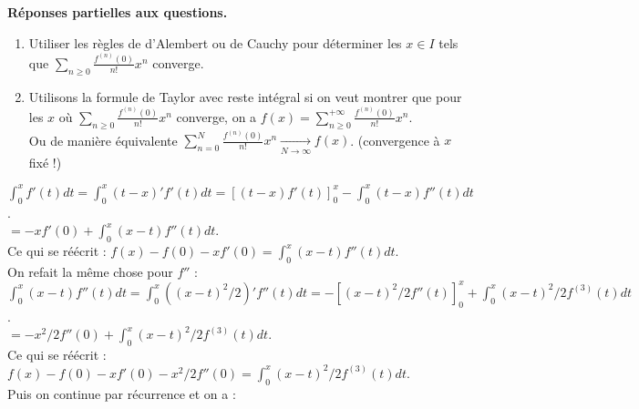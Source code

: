 \documentclass{article}
\begin{document}
\textbf{Réponses partielles aux questions.}
\begin{enumerate}
    \item Utiliser les règles de d'Alembert ou de Cauchy pour déterminer les $x \in I$ tels que $\sum_{n\geq0} \frac{f^{(n)}(0)}{n!} x^n$ converge.
    \item Utilisons la formule de Taylor avec reste intégral si on veut montrer que pour les $x$ où $\sum_{n\geq0} \frac{f^{(n)}(0)}{n!} x^n$ converge, on a $f(x) = \sum_{n\geq0}^{+\infty} \frac{f^{(n)}(0)}{n!} x^n$.\\
    Ou de manière équivalente $\sum_{n=0}^{N} \frac{f^{(n)}(0)}{n!} x^n \xrightarrow[N\to\infty]{} f(x)$. (convergence à $x$ fixé !)
\end{enumerate}


$\int_{0}^{x} f'(t) dt = \int_{0}^{x} (t - x)' f'(t) dt = [(t-x)f'(t)]_{0}^{x} - \int_{0}^{x} (t-x) f''(t) dt$.\\
$= -x f'(0) + \int_{0}^{x} (x-t) f''(t) dt$.\\
Ce qui se réécrit : $f(x) - f(0) - xf'(0) = \int_{0}^{x} (x-t) f''(t) dt$.\\
On refait la même chose pour $f''$ :\\
$\int_{0}^{x} (x-t) f''(t) dt = \int_{0}^{x} ((x-t)^2/2)' f''(t) dt = - [(x-t)^2/2 f''(t)]_{0}^{x} + \int_{0}^{x} (x-t)^2/2 f^{(3)}(t) dt$.\\
$= -x^2/2 f''(0) + \int_{0}^{x} (x-t)^2/2 f^{(3)}(t) dt$.\\
Ce qui se réécrit : $f(x) - f(0) - xf'(0) - x^2/2 f''(0) = \int_{0}^{x} (x-t)^2/2 f^{(3)}(t) dt$.\\
Puis on continue par récurrence et on a :
\end{document}
